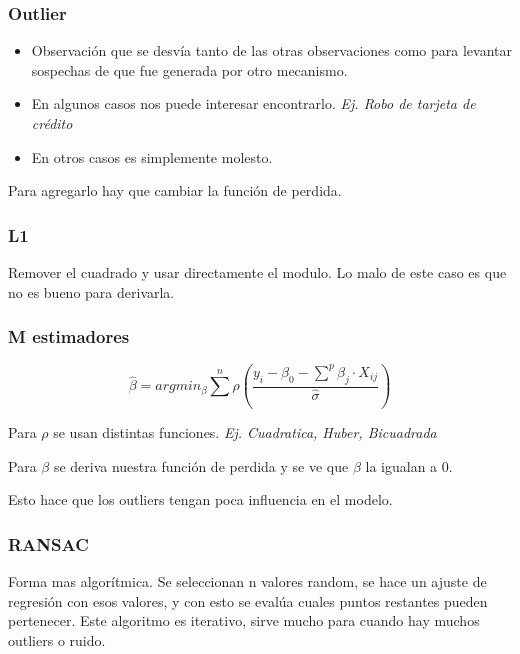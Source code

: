 \documentclass[titlepage,a4paper]{article}
\begin{document}
\subsubsection*{Outlier}
\begin{itemize}
    \item Observación que se desvía tanto de las otras observaciones como para levantar sospechas de que fue generada por otro mecanismo.
    \item En algunos casos nos puede interesar encontrarlo. \textit{Ej. Robo de tarjeta de crédito}
    \item En otros casos es simplemente molesto.
\end{itemize}


Para agregarlo hay que cambiar la función de perdida.

\subsubsection{L1}
Remover el cuadrado y usar directamente el modulo. Lo malo de este caso es que no es bueno para derivarla.

\subsubsection{M estimadores}
\begin{equation}
    \hat{\beta} = arg min_\beta \sum^{n} \rho(\frac{ y_{i}-\beta_0-\sum^{p}\beta_j \cdot X_{ij}}{\hat{\sigma}})
\end{equation}

Para $\rho$ se usan distintas funciones. \textit{Ej. Cuadratica, Huber, Bicuadrada}

Para $\beta$ se deriva nuestra función de perdida y se ve que $\beta$ la igualan a 0.

Esto hace que los outliers tengan poca influencia en el modelo.


\subsubsection{RANSAC}
Forma mas algorítmica. Se seleccionan n valores random, se hace un ajuste de regresión con esos valores, y con esto se evalúa cuales puntos restantes pueden pertenecer. Este algoritmo es iterativo, sirve mucho para cuando hay muchos outliers o ruido.

\end{document}
